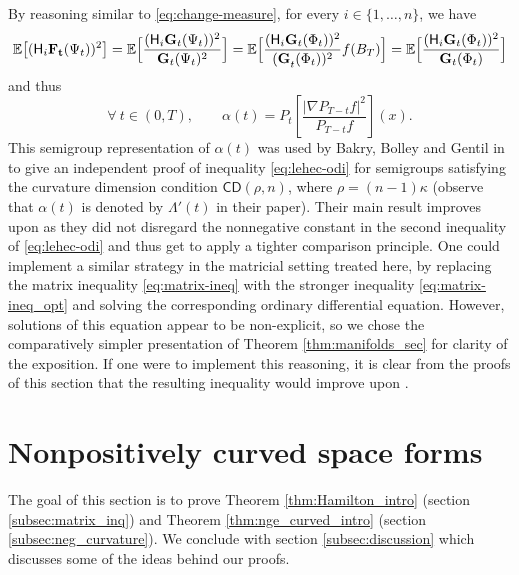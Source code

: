 \documentclass[a4paper,twoside,11pt,reqno]{amsart}
\newcommand{\li}{\bf }
\newcommand{\mb}{\mathbb}
\newcommand{\msf}{\mathsf}
\newcommand{\HH}{\mathsf{H}}
\begin{document}
By reasoning similar to \eqref{eq:change-measure}, for every $i\in\{1,\ldots,n\}$, we have
\begin{equation}
\mb{E}\big[ (\HH_i {\li F_t}(\Psi_t))^2 \big] = \mb{E} \Big[ \frac{(\HH_i {\li G}_t(\Psi_t))^2}{{\li G}_t(\Psi_t)^2}\Big] = \mb{E}\Big[ \frac{(\HH_i {\li G}_t(\Phi_t))^2}{{(\li G}_t(\Phi_t))^2} f(B_T)\Big] = \mb{E} \Big[ \frac{(\HH_i {\li G}_t(\Phi_t))^2}{{\li G}_t(\Phi_t)}\Big]
\end{equation}
and thus
\begin{equation}
\forall \ t\in(0,T),\qquad \alpha(t) = P_t\left[ \frac{|\nabla P_{T-t}f|^2}{P_{T-t}f} \right](x).
\end{equation}
This semigroup representation of $\alpha(t)$ was used by Bakry, Bolley and Gentil in \cite[p.~405]{BBL17} to give an independent proof of inequality \eqref{eq:lehec-odi} for semigroups satisfying the curvature dimension condition $\msf{CD}(\rho,n)$, where $\rho=(n-1)\kappa$ (observe that $\alpha(t)$ is denoted by $\Lambda'(t)$ in their paper). Their main result \cite[Theorem~2.2]{BBL17} improves upon \cite[Equation~(25)]{Leh17} as they did not disregard the nonnegative constant in the second inequality of \eqref{eq:lehec-odi} and thus get to apply a tighter comparison principle. One could implement a similar strategy in the matricial setting treated here, by replacing the matrix inequality \eqref{eq:matrix-ineq} with the stronger inequality \eqref{eq:matrix-ineq_opt} and solving the corresponding ordinary differential equation. However, solutions of this equation appear to be non-explicit, so we chose the comparatively simpler presentation of Theorem \ref{thm:manifolds_sec} for clarity of the exposition. If one were to implement this reasoning, it is clear from the proofs of this section that the resulting inequality would improve upon \cite[Theorem~2.2]{BBL17}.


\section{Nonpositively curved space forms}
\label{sec:nonpos}
The goal of this section is to prove  Theorem \ref{thm:Hamilton_intro} (section \ref{subsec:matrix_inq}) and Theorem \ref{thm:nge_curved_intro} (section \ref{subsec:neg_curvature}). We conclude with section \ref{subsec:discussion} which discusses some of the ideas behind our proofs.
\end{document}
